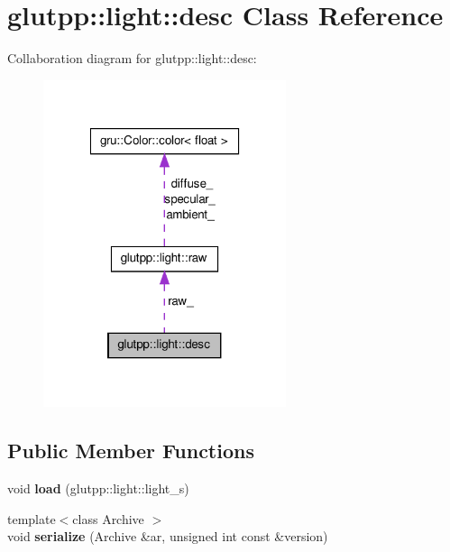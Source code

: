 \hypertarget{classglutpp_1_1light_1_1desc}{\section{glutpp\-:\-:light\-:\-:desc \-Class \-Reference}
\label{classglutpp_1_1light_1_1desc}
}


\-Collaboration diagram for glutpp\-:\-:light\-:\-:desc\-:\nopagebreak
\begin{figure}[H]
\begin{center}
\leavevmode
\includegraphics[width=202pt]{classglutpp_1_1light_1_1desc__coll__graph}
\end{center}
\end{figure}
\subsection*{\-Public \-Member \-Functions}
\begin{DoxyCompactItemize}
\item 
\hypertarget{classglutpp_1_1light_1_1desc_a4da8561e1313aa9fc72a30bae278faa5}{void {\bfseries load} (glutpp\-::light\-::light\-\_\-s)}\label{classglutpp_1_1light_1_1desc_a4da8561e1313aa9fc72a30bae278faa5}

\item 
\hypertarget{classglutpp_1_1light_1_1desc_ad1d6be4fb431b158e6c5b5e97f45deb9}{{\footnotesize template$<$class Archive $>$ }\\void {\bfseries serialize} (\-Archive \&ar, unsigned int const \&version)}\label{classglutpp_1_1light_1_1desc_ad1d6be4fb431b158e6c5b5e97f45deb9}

\end{DoxyCompactItemize}
